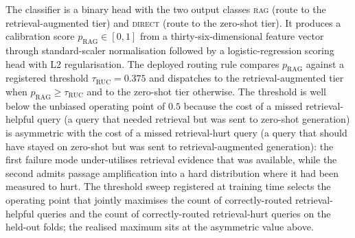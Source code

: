 The classifier is a binary head with the two output classes \textsc{rag} (route to the retrieval-augmented tier) and \textsc{direct} (route to the zero-shot tier). It produces a calibration score $p_{\text{RAG}} \in [0, 1]$ from a thirty-six-dimensional feature vector through standard-scaler normalisation followed by a logistic-regression scoring head with L2 regularisation. The deployed routing rule compares $p_{\text{RAG}}$ against a registered threshold $\tau_{\text{RUC}} = 0.375$ and dispatches to the retrieval-augmented tier when $p_{\text{RAG}} \ge \tau_{\text{RUC}}$ and to the zero-shot tier otherwise. The threshold is well below the unbiased operating point of $0.5$ because the cost of a missed retrieval-helpful query (a query that needed retrieval but was sent to zero-shot generation) is asymmetric with the cost of a missed retrieval-hurt query (a query that should have stayed on zero-shot but was sent to retrieval-augmented generation): the first failure mode under-utilises retrieval evidence that was available, while the second admits passage amplification into a hard distribution where it had been measured to hurt. The threshold sweep registered at training time selects the operating point that jointly maximises the count of correctly-routed retrieval-helpful queries and the count of correctly-routed retrieval-hurt queries on the held-out folds; the realised maximum sits at the asymmetric value above.

